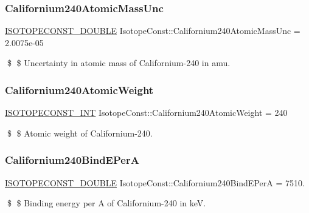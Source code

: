 \subsubsection{\texorpdfstring{Californium240\+Atomic\+Mass\+Unc}{Californium240AtomicMassUnc}}
{\footnotesize\ttfamily \mbox{\hyperlink{group___isotope_const-_macros_ga8f45a7272ce02c0b4c65c44636ed719a}{I\+S\+O\+T\+O\+P\+E\+C\+O\+N\+S\+T\+\_\+\+D\+O\+U\+B\+LE}} Isotope\+Const\+::\+Californium240\+Atomic\+Mass\+Unc = 2.\+0075e-\/05}

\$ \$ Uncertainty in atomic mass of Californium-\/240 in amu. \mbox{\label{group___isotope_const-_californium-_cf240_ga3d26e5f197b5d6b7f0328f293d7250d6}} 
\subsubsection{\texorpdfstring{Californium240\+Atomic\+Weight}{Californium240AtomicWeight}}
{\footnotesize\ttfamily \mbox{\hyperlink{group___isotope_const-_macros_ga5f18360b3e99483a35c32d789e62621c}{I\+S\+O\+T\+O\+P\+E\+C\+O\+N\+S\+T\+\_\+\+I\+NT}} Isotope\+Const\+::\+Californium240\+Atomic\+Weight = 240}

\$ \$ Atomic weight of Californium-\/240. \mbox{\label{group___isotope_const-_californium-_cf240_gaa0f408d1c7fec52b99f42c1fc4a9a5ee}} 
\subsubsection{\texorpdfstring{Californium240\+Bind\+E\+PerA}{Californium240BindEPerA}}
{\footnotesize\ttfamily \mbox{\hyperlink{group___isotope_const-_macros_ga8f45a7272ce02c0b4c65c44636ed719a}{I\+S\+O\+T\+O\+P\+E\+C\+O\+N\+S\+T\+\_\+\+D\+O\+U\+B\+LE}} Isotope\+Const\+::\+Californium240\+Bind\+E\+PerA = 7510.}

\$ \$ Binding energy per A of Californium-\/240 in keV. \mbox{\label{group___isotope_const-_californium-_cf240_ga7e608df6f204acffdef2e40d014a8c72}} 
